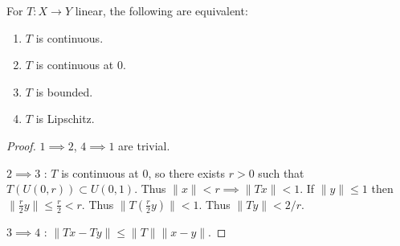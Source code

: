 \begin{proposition}
	\label{prop:ContinuousLinearOperator}
	For $T: X \to Y$ linear, the following are equivalent:
	\begin{enumerate}
		\item $T$ is continuous.
		\item  $T$ is continuous at $0$.
		\item $T$ is bounded.
		\item $T$ is Lipschitz.
	\end{enumerate}
	
\end{proposition}
\begin{proof}
	$1 \implies 2$, $4 \implies1$ are trivial. 

	$2 \implies 3$ : $T$ is continuous at $0$, so there exists $r > 0$ such that $T(U(0,r)) \subset U(0,1)$. Thus $\|x\| < r \implies \|T x\| < 1$. If $\|y\|\le 1$ then $\|\frac{r}{2}y\|\le \frac{r}{2} < r$. Thus $\|T \left( \frac{r}{2} y \right) \| < 1$. Thus
	$\|T y\| < 2 / r$.

	$3 \implies4$ : $\|T x - T y\| \le  \|T\| \|x - y\|$.
\end{proof}

